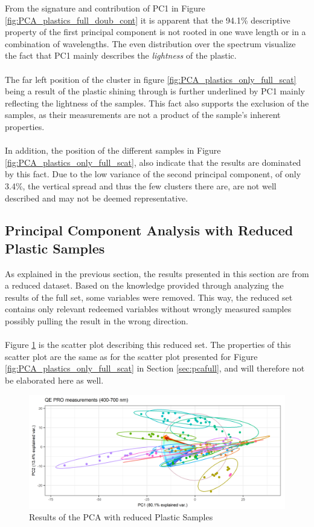 \noindent
From the signature and contribution of PC1 in Figure \ref{fig:PCA_plastics_full_doub_cont} it is apparent that the 94.1\% descriptive property of the first principal component is not rooted in one wave length or in a combination of wavelengths. The even distribution over the spectrum visualize the fact that PC1 mainly describes the \textit{lightness} of the plastic.
\\\\
The far left position of the cluster in figure \ref{fig:PCA_plastics_only_full_scat} being a result of the plastic shining through is further underlined by PC1 mainly reflecting the lightness of the samples. This fact also supports the exclusion of the samples, as their measurements are not a product of the sample's inherent properties.
\\\\
In addition, the position of the different samples in Figure \ref{fig:PCA_plastics_only_full_scat}, also indicate that the results are dominated by this fact. Due to the low variance of the second principal component, of only 3.4\%, the vertical spread and thus the few clusters there are, are not well described and may not be deemed representative.

\subsection{Principal Component Analysis with Reduced Plastic Samples}
As explained in the previous section, the results presented in this section are from a reduced dataset. Based on the knowledge provided through analyzing the results of the full set, some variables were removed. This way, the reduced set contains only relevant redeemed variables without wrongly measured samples possibly pulling the result in the wrong direction. 
\\\\
Figure \ref{fig:PCA_plastics_reduced_only_scat} is the scatter plot describing this reduced set. The properties of this scatter plot are the same as for the scatter plot presented for Figure \ref{fig:PCA_plastics_only_full_scat} in Section \ref{sec:pcafull}, and will therefore not be elaborated here as well.

\begin{figure}[H]
    \centering
    \includegraphics[width=1\textwidth]{Images/results/PCA_plastics_reduced_only_scat.png}
    \caption[PCA Reduced Set]{Results of the PCA with reduced Plastic Samples}
    \label{fig:PCA_plastics_reduced_only_scat}
\end{figure}

